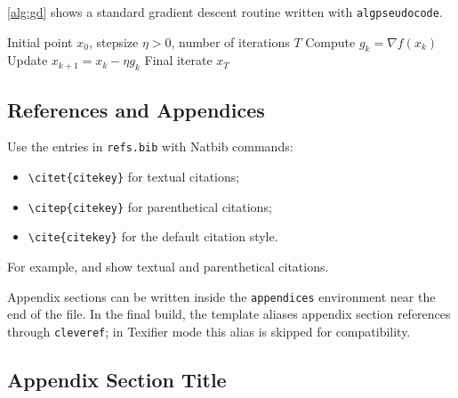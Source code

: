 \documentclass[letterpaper,12pt]{article}
\begin{document}
\cref{alg:gd} shows a standard gradient descent routine written with \texttt{algpseudocode}.

\begin{algorithm}[htbp]
\caption{Gradient Descent}
\label{alg:gd}
\begin{algorithmic}[1]
\Require Initial point $x_0$, stepsize $\eta>0$, number of iterations $T$
    \State Compute $g_k=\nabla f(x_k)$
    \State Update $x_{k+1}=x_k-\eta g_k$
\EndFor
\Ensure Final iterate $x_T$
\end{algorithmic}
\end{algorithm}

\subsection{References and Appendices}

Use the entries in \texttt{refs.bib} with Natbib commands:
\begin{itemize}
    \item \verb|\citet{citekey}| for textual citations;
    \item \verb|\citep{citekey}| for parenthetical citations;
    \item \verb|\cite{citekey}| for the default citation style.
\end{itemize}
For example, \citet{Cyrus2018RobustAcceleratedOptimization} and \citep{Cyrus2018RobustAcceleratedOptimization} show textual and parenthetical citations.

Appendix sections can be written inside the \texttt{appendices} environment near the end of the file. In the final build, the template aliases appendix section references through \texttt{cleveref}; in Texifier mode this alias is skipped for compatibility.

\newpage



\newpage
\begin{appendices}
\section{Appendix Section Title}
\end{appendices}
\end{document}
